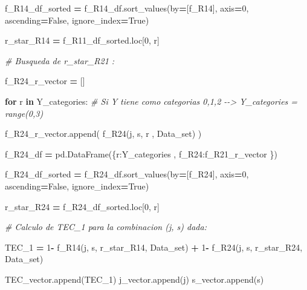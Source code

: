 \documentclass[
  11pt,
  a4paper,
]{article}
\newenvironment{Shaded}{\begin{snugshade}}{\end{snugshade}}
\newcommand{\CommentTok}[1]{\textcolor[rgb]{0.56,0.35,0.01}{\textit{#1}}}
\newcommand{\ControlFlowTok}[1]{\textcolor[rgb]{0.13,0.29,0.53}{\textbf{#1}}}
\newcommand{\DecValTok}[1]{\textcolor[rgb]{0.00,0.00,0.81}{#1}}
\newcommand{\KeywordTok}[1]{\textcolor[rgb]{0.13,0.29,0.53}{\textbf{#1}}}
\newcommand{\NormalTok}[1]{#1}
\newcommand{\OperatorTok}[1]{\textcolor[rgb]{0.81,0.36,0.00}{\textbf{#1}}}
\newcommand{\StringTok}[1]{\textcolor[rgb]{0.31,0.60,0.02}{#1}}
\newcommand{\VariableTok}[1]{\textcolor[rgb]{0.00,0.00,0.00}{#1}}
\begin{document}
\begin{Shaded}
\begin{Highlighting}[]
\NormalTok{                f\_R14\_df\_sorted }\OperatorTok{=}\NormalTok{ f\_R14\_df.sort\_values(by}\OperatorTok{=}\NormalTok{[}\StringTok{\textquotesingle{}f\_R14\textquotesingle{}}\NormalTok{], axis}\OperatorTok{=}\DecValTok{0}\NormalTok{, ascending}\OperatorTok{=}\VariableTok{False}\NormalTok{, ignore\_index}\OperatorTok{=}\VariableTok{True}\NormalTok{)}

\NormalTok{                r\_star\_R14 }\OperatorTok{=}\NormalTok{ f\_R11\_df\_sorted.loc[}\DecValTok{0}\NormalTok{, }\StringTok{\textquotesingle{}r\textquotesingle{}}\NormalTok{]}


                \CommentTok{\# Busqueda de r\_star\_R21 :}

\NormalTok{                f\_R24\_r\_vector }\OperatorTok{=}\NormalTok{ []}

                \ControlFlowTok{for}\NormalTok{ r }\KeywordTok{in}\NormalTok{ Y\_categories:  }\CommentTok{\# Si Y tiene como categorias 0,1,2 {-}{-}\textgreater{} Y\_categories = range(0,3)}

\NormalTok{                    f\_R24\_r\_vector.append( f\_R24(j, s, r , Data\_set) )}

\NormalTok{                f\_R24\_df }\OperatorTok{=}\NormalTok{ pd.DataFrame(\{}\StringTok{\textquotesingle{}r\textquotesingle{}}\NormalTok{:Y\_categories  , }\StringTok{\textquotesingle{}f\_R24\textquotesingle{}}\NormalTok{:f\_R21\_r\_vector \})}
        
\NormalTok{                f\_R24\_df\_sorted }\OperatorTok{=}\NormalTok{ f\_R24\_df.sort\_values(by}\OperatorTok{=}\NormalTok{[}\StringTok{\textquotesingle{}f\_R24\textquotesingle{}}\NormalTok{], axis}\OperatorTok{=}\DecValTok{0}\NormalTok{, ascending}\OperatorTok{=}\VariableTok{False}\NormalTok{, ignore\_index}\OperatorTok{=}\VariableTok{True}\NormalTok{)}

\NormalTok{                r\_star\_R24 }\OperatorTok{=}\NormalTok{ f\_R24\_df\_sorted.loc[}\DecValTok{0}\NormalTok{, }\StringTok{\textquotesingle{}r\textquotesingle{}}\NormalTok{]}


                \CommentTok{\# Calculo de TEC\_1 para la combinacion (j, s) dada:}

\NormalTok{                TEC\_1 }\OperatorTok{=} \DecValTok{1}\OperatorTok{{-}}\NormalTok{ f\_R14(j, s, r\_star\_R14, Data\_set) }\OperatorTok{+} \DecValTok{1}\OperatorTok{{-}}\NormalTok{ f\_R24(j, s, r\_star\_R24, Data\_set)}

\NormalTok{                TEC\_vector.append(TEC\_1)}
\NormalTok{                j\_vector.append(j)}
\NormalTok{                s\_vector.append(s)}



\end{Highlighting}
\end{Shaded}
\end{document}
